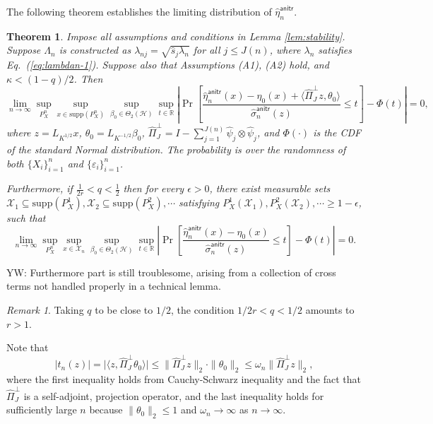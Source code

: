 \documentclass[11pt,a4paper]{article}
\renewcommand{\hat}{\widehat}
\theoremstyle{definition}
\theoremstyle{plain}
\newtheorem{theorem}{Theorem}[section]
\theoremstyle{remark}
\newtheorem{remark}{Remark}[section]
\newcommand{\supp}{\mathrm{supp}}
\newcommand{\mX}{\mathcal X}
\newcommand{\mH}{\mathcal H}
\newcommand{\anitr}{\mathsf{anitr}}
\begin{document}
The following theorem establishes the limiting distribution of $\hat\eta_n^\anitr$.
\begin{theorem}
Impose all assumptions and conditions in Lemma \ref{lem:stability}. Suppose $\Lambda_n$ is constructed as $\lambda_{nj}=\sqrt{\hat s_j\lambda_n}$ for all $j\leq J(n)$,
where $\lambda_n$ satisfies Eq.~(\ref{eq:lambdan-1}). Suppose also that Assumptions (A1), (A2) hold, and $\kappa<(1-q)/2$. Then 
$$
\lim_{n\to\infty} \sup_{P_X^n}\sup_{x\in\supp(P_X^n)}\sup_{\beta_0\in\Theta_2(\mH)}\sup_{t\in\mathbb R}\left|\Pr\left[\frac{\hat\eta_n^{\anitr}(x)-\eta_0(x)+\langle\hat\Pi_J^\perp z, \theta_0\rangle}{\hat\sigma_n^\anitr(z)}\leq t\right] - \Phi(t)\right| = 0,
$$
where $z=L_{K^{1/2}}x$, $\theta_0=L_{K^{-1/2}}\beta_0$, $\hat\Pi_J^\perp = I - \sum_{j=1}^{J(n)}\hat\psi_j\otimes\hat\psi_j$, and $\Phi(\cdot)$ is the CDF of the standard Normal distribution.
The probability is over the randomness of both $\{X_i\}_{i=1}^n$ and $\{\varepsilon_i\}_{i=1}^n$. 

{\color{red}
Furthermore, if $\frac{1}{2r}<q<\frac{1}{2}$ then for every $\epsilon>0$, there exist measurable sets $\mX_1\subseteq\supp(P_X^1),\mX_2\subseteq\supp(P_X^2),\cdots$ satisfying $P_X^1(\mX_1),P_X^2(\mX_2),\cdots\geq 1-\epsilon$,
such that
$$
\lim_{n\to\infty} \sup_{P_X^n}\sup_{x\in\mX_n}\sup_{\beta_0\in\Theta_2(\mH)}\sup_{t\in\mathbb R}\left|\Pr\left[\frac{\hat\eta_n^{\anitr}(x)-\eta_0(x)}{\hat\sigma_n^\anitr(z)}\leq t\right] - \Phi(t)\right| = 0.
$$}
\label{thm:anitr-limiting}
\end{theorem}

{\color{red} YW: Furthermore part is still troublesome, arising from a collection of cross terms not handled properly in a technical lemma.}

\begin{remark}
Taking $q$ to be close to $1/2$, the condition $1/2r<q<1/2$ amounts to $r>1$.
\end{remark}

Note that 
\begin{equation}
\big|t_n(z)\big| = \big|\langle z, \hat\Pi_J^\perp\theta_0\rangle\big|\leq \|\hat\Pi_J^\perp z\|_2\cdot \|\theta_0\|_2 \leq \omega_n\|\hat\Pi_J^\perp z\|_2,
\label{eq:anitr-limiting-impl}
\end{equation}
where the first inequality holds from Cauchy-Schwarz inequality and the fact that $\hat\Pi_J^\perp$ is a self-adjoint, projection operator, and the 
last inequality holds for sufficiently large $n$ because $\|\theta_0\|_2\leq 1$ and $\omega_n\to\infty$ as $n\to\infty$.
\end{document}
